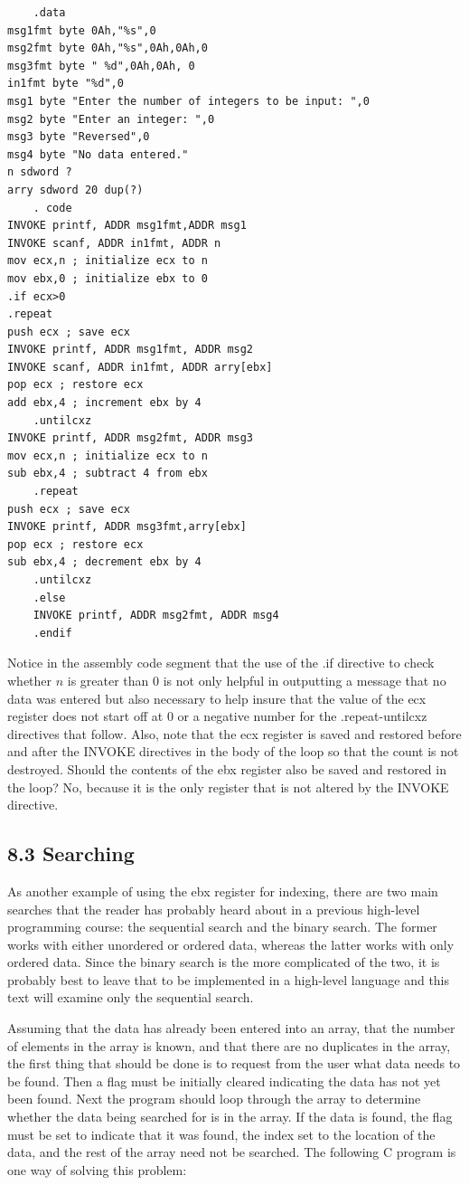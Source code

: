 \documentclass[10pt]{book}
\begin{document}
\begin{center}
\begin{center}
\begin{verbatim}
    .data
msg1fmt byte 0Ah,"%s",0
msg2fmt byte 0Ah,"%s",0Ah,0Ah,0
msg3fmt byte " %d",0Ah,0Ah, 0
in1fmt byte "%d",0
msg1 byte "Enter the number of integers to be input: ",0
msg2 byte "Enter an integer: ",0
msg3 byte "Reversed",0
msg4 byte "No data entered."
n sdword ?
arry sdword 20 dup(?)
    . code
INVOKE printf, ADDR msg1fmt,ADDR msg1
INVOKE scanf, ADDR in1fmt, ADDR n
mov ecx,n ; initialize ecx to n
mov ebx,0 ; initialize ebx to 0
.if ecx>0
.repeat
push ecx ; save ecx
INVOKE printf, ADDR msg1fmt, ADDR msg2
INVOKE scanf, ADDR in1fmt, ADDR arry[ebx]
pop ecx ; restore ecx
add ebx,4 ; increment ebx by 4
    .untilcxz
INVOKE printf, ADDR msg2fmt, ADDR msg3
mov ecx,n ; initialize ecx to n
sub ebx,4 ; subtract 4 from ebx
    .repeat
push ecx ; save ecx
INVOKE printf, ADDR msg3fmt,arry[ebx]
pop ecx ; restore ecx
sub ebx,4 ; decrement ebx by 4
    .untilcxz
    .else
    INVOKE printf, ADDR msg2fmt, ADDR msg4
    .endif
\end{verbatim}

Notice in the assembly code segment that the use of the .if directive to check whether $n$ is greater than 0 is not only helpful in outputting a message that no data was entered but also necessary to help insure that the value of the ecx register does not start off at 0 or a negative number for the .repeat-untilcxz directives that follow. Also, note that the ecx register is saved and restored before and after the INVOKE directives in the body of the loop so that the count is not destroyed. Should the contents of the ebx register also be saved and restored in the loop? No, because it is the only register that is not altered by the INVOKE directive.

\subsection*{8.3 Searching}
As another example of using the ebx register for indexing, there are two main searches that the reader has probably heard about in a previous high-level programming course: the sequential search and the binary search. The former works with either unordered or ordered data, whereas the latter works with only ordered data. Since the binary search is the more complicated of the two, it is probably best to leave that to be implemented in a high-level language and this text will examine only the sequential search.


Assuming that the data has already been entered into an array, that the number of elements in the array is known, and that there are no duplicates in the array, the first thing that should be done is to request from the user what data needs to be found. Then a flag must be initially cleared indicating the data has not yet been found. Next the program should loop through the array to determine whether the data being searched for is in the array. If the data is found, the flag must be set to indicate that it was found, the index set to the location of the data, and the rest of the array need not be searched. The following C program is one way of solving this problem:


\end{center}
\end{center}
\end{document}
